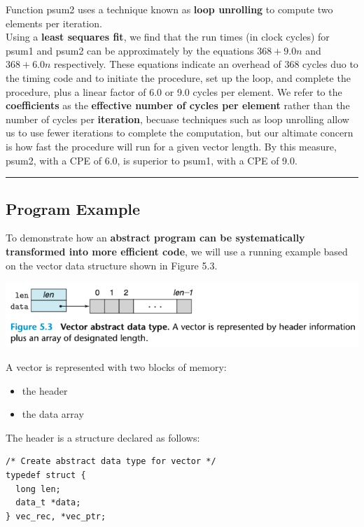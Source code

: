 \documentclass[11pt]{article}
\begin{document}
Function psum2 uses a technique known as \textbf{loop unrolling} to compute two elements per iteration.\\

Using a \textbf{least sequares fit}, we find that the run times (in clock cycles) for psum1 and psum2 can be approximately by the equations \(368 + 9.0n\) and \(368+6.0n\) respectively. These equations indicate an overhead of 368 cycles duo to the timing code and to initiate the procedure, set up the loop, and complete the procedure, plus a linear factor of 6.0 or 9.0 cycles per element. We refer to the \textbf{coefficients} as the \textbf{effective number of cycles per element} rather than the number of cycles per \textbf{iteration}, becuase techniques such as loop unrolling allow us to use fewer iterations to complete the computation, but our altimate concern is how fast the procedure will run for a given vector length. By this measure, psum2, with a CPE of 6.0, is superior to psum1, with a CPE of 9.0.\\

\noindent\rule{\textwidth}{0.5pt}

\subsection{Program Example}
\label{sec:org20417d2}
To demonstrate how an \textbf{abstract program can be systematically transformed into more efficient code}, we will use a running example based on the vector data structure shown in Figure 5.3.\\

\begin{center}
\includegraphics[width=.9\linewidth]{pics/figure5.3-vector-abstract-data-type.png}
\end{center}

A vector is represented with two blocks of memory:\\
\begin{itemize}
\item the header\\
\item the data array\\
\end{itemize}

The header is a structure declared as follows:\\
\begin{verbatim}
/* Create abstract data type for vector */
typedef struct {
  long len;
  data_t *data;
} vec_rec, *vec_ptr;
\end{verbatim}
\end{document}
